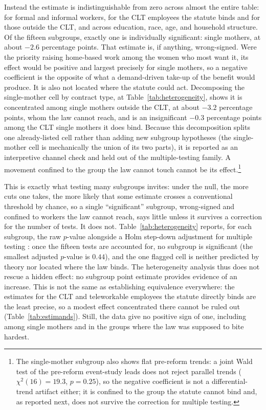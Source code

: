 \documentclass[12pt]{article}
\begin{document}
Instead the estimate is indistinguishable from zero across almost the entire table: for formal and informal workers, for the CLT employees the statute binds and for those outside the CLT, and across education, race, age, and household structure. Of the fifteen subgroups, exactly one is individually significant: single mothers, at about $-2.6$ percentage points. That estimate is, if anything, wrong-signed. Were the priority raising home-based work among the women who most want it, its effect would be positive and largest precisely for single mothers, so a negative coefficient is the opposite of what a demand-driven take-up of the benefit would produce. It is also not located where the statute could act. Decomposing the single-mother cell by contract type, at Table~\ref{tab:heterogeneity}, shows it is concentrated among single mothers outside the CLT, at about $-3.2$ percentage points, whom the law cannot reach, and is an insignificant $-0.3$ percentage points among the CLT single mothers it does bind. Because this decomposition splits one already-listed cell rather than adding new subgroup hypotheses (the single-mother cell is mechanically the union of its two parts), it is reported as an interpretive channel check and held out of the multiple-testing family. A movement confined to the group the law cannot touch cannot be its effect.\footnote{The single-mother subgroup also shows flat pre-reform trends: a joint Wald test of the pre-reform event-study leads does not reject parallel trends ($\chi^2(16)=19.3$, $p=0.25$), so the negative coefficient is not a differential-trend artifact either; it is confined to the group the statute cannot bind and, as reported next, does not survive the correction for multiple testing.}

This is exactly what testing many subgroups invites: under the null, the more cuts one takes, the more likely that some estimate crosses a conventional threshold by chance, so a single ``significant'' subgroup, wrong-signed and confined to workers the law cannot reach, says little unless it survives a correction for the number of tests. It does not. Table~\ref{tab:heterogeneity} reports, for each subgroup, the raw $p$-value alongside a Holm step-down adjustment for multiple testing \citep{holm1979}: once the fifteen tests are accounted for, no subgroup is significant (the smallest adjusted $p$-value is $0.44$), and the one flagged cell is neither predicted by theory nor located where the law binds. The heterogeneity analysis thus does not rescue a hidden effect: no subgroup point estimate provides evidence of an increase. This is not the same as establishing equivalence everywhere: the estimates for the CLT and teleworkable employees the statute directly binds are the least precise, so a modest effect concentrated there cannot be ruled out (Table~\ref{tab:estimands}). Still, the data give no positive sign of one, including among single mothers and in the groups where the law was supposed to bite hardest.
\end{document}
